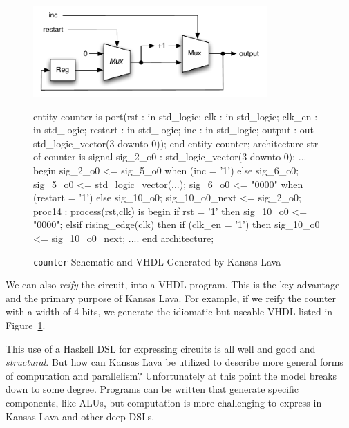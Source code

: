 \documentclass[11pt]{article}
\begin{document}
\begin{figure}[!t]
  \centering
  \begin{minipage}{0.5\textwidth}
    \centering
    \includegraphics[width=0.8\textwidth]{images/Counter.pdf}
  \end{minipage}\begin{minipage}{0.5\textwidth}
     \centering
\footnotesize\begin{Code}[fontsize=\tiny]
entity counter is
  port(rst : in std_logic;
       clk : in std_logic;
       clk_en : in std_logic;
       restart : in std_logic;
       inc : in std_logic;
       output : out std_logic_vector(3 downto 0));
end entity counter;
architecture str of counter is
  signal sig_2_o0 : std_logic_vector(3 downto 0);
  ...
begin
  sig_2_o0 <= sig_5_o0 when (inc = '1')  else sig_6_o0;
  sig_5_o0 <= std_logic_vector(...);
  sig_6_o0 <= "0000" when (restart = '1') else sig_10_o0;
  sig_10_o0_next <= sig_2_o0;
  proc14 : process(rst,clk) is
  begin
    if rst = '1' then
      sig_10_o0 <= "0000";
    elsif rising_edge(clk) then
      if (clk_en = '1') then
        sig_10_o0 <= sig_10_o0_next;
  ....
end architecture;
\end{Code}
  \end{minipage}
  \caption{{\tt counter} Schematic and VHDL Generated by Kansas Lava}
  \label{fig:counter-picture}
\end{figure}

We can also {\em reify\/} the circuit, into
a VHDL program. This is the key advantage and the
primary purpose of Kansas Lava. For example,
if we reify the counter with a width of 4 bits, we generate
the idiomatic but useable VHDL
listed in Figure~\ref{fig:counter-picture}.

This use of a Haskell DSL for expressing circuits
is all well and good and {\em structural\/}.
But how can Kansas Lava be utilized to
describe more general forms of computation and parallelism?
Unfortunately at this point the model breaks down
to some degree. Programs can be written
that generate specific components, like ALUs,
but computation is more challenging to express
in Kansas Lava and other deep DSLs.
\end{document}
